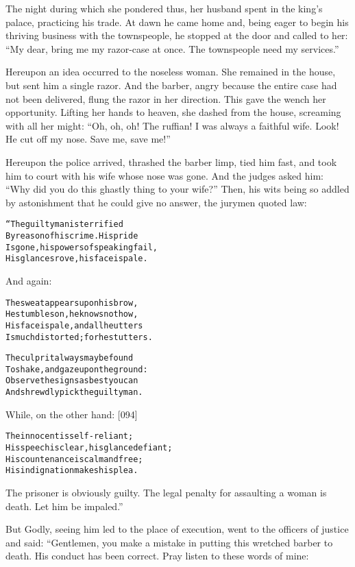 \documentclass{article}
\renewenvironment{verbatim}{\begin{alltt}\normalfont\begin{centering}}{\end{centering}\end{alltt}}
\begin{document}
The night during which she pondered thus, her husband spent in the
king's palace, practicing his trade. At dawn he came home and,
being eager to begin his thriving business with the townspeople, he
stopped at the door and called to her:
``My dear, bring me my razor-case at once. The townspeople need my services.''

Hereupon an idea occurred to the noseless woman. She remained in
the house, but sent him a single razor. And the barber, angry
because the entire case had not been delivered, flung the razor in
her direction. This gave the wench her opportunity. Lifting her
hands to heaven, she dashed from the house, screaming with all her
might:
``Oh, oh, oh! The ruffian! I was always a faithful wife. Look! He cut off my nose. Save me, save me!''

Hereupon the police arrived, thrashed the barber limp, tied him
fast, and took him to court with his wife whose nose was gone. And
the judges asked him:
``Why did you do this ghastly thing to your wife?'' Then, his wits
being so addled by astonishment that he could give no answer, the
jurymen quoted law:

\begin{verbatim}
“The guilty man is terrified
By reason of his crime. His pride
Is gone, his powers of speaking fail,
His glances rove, his face is pale.
\end{verbatim}
And again:

\begin{verbatim}
The sweat appears upon his brow,
He stumbles on, he knows not how,
His face is pale, and all he utters
Is much distorted; for he stutters.

The culprit always may be found
To shake, and gaze upon the ground:
Observe the signs as best you can
And shrewdly pick the guilty man.
\end{verbatim}
While, on the other hand: [094]

\begin{verbatim}
The innocent is self-reliant;
His speech is clear, his glance defiant;
His countenance is calm and free;
His indignation makes his plea.
\end{verbatim}
The prisoner is obviously guilty. The legal penalty for assaulting
a woman is death. Let him be impaled.”

But Godly, seeing him led to the place of execution, went to the
officers of justice and said: “Gentlemen, you make a mistake in
putting this wretched barber to death. His conduct has been
correct. Pray listen to these words of mine:
\end{document}
